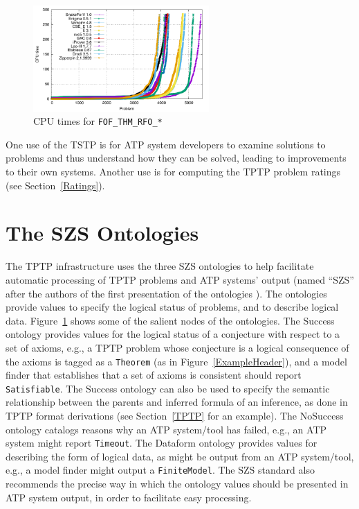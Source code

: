 \documentclass{easychair}
\begin{document}
\begin{figure}[t!]
\centering
\includegraphics[width=0.6\textwidth]{FOF_THM_RFO_PPP.pdf}
\vspace*{-1em}
\caption{CPU times for {\tt FOF\_THM\_RFO\_*}}
\label{PPPPlot}
\end{figure}

One use of the TSTP is for ATP system developers to examine solutions to problems and thus 
understand how they can be solved, leading to improvements to their own systems. 
Another use is for computing the TPTP problem ratings (see Section~\ref{Ratings}).

\section{The SZS Ontologies}
\label{SZS}

The TPTP infrastructure uses the three SZS ontologies to help facilitate 
automatic processing of TPTP problems and ATP systems' output 
\cite{Sut08-KEAPPA} (named ``SZS'' after the authors of the first 
presentation of the ontologies \cite{SZS03}).
The ontologies provide values to specify the logical status of problems, and 
to describe logical data.
Figure~\ref{SZS} shows some of the salient nodes of the ontologies.
The Success ontology provides values for the logical status of a conjecture 
with respect to a set of axioms, e.g., a TPTP problem whose conjecture is a
logical consequence of the axioms is tagged as a {\tt Theorem} (as in 
Figure~\ref{ExampleHeader}), and a model finder that establishes that a set 
of axioms is consistent should report {\tt Satisfiable}.
The Success ontology can also be used to specify the semantic relationship 
between the parents and inferred formula of an inference, as done in TPTP 
format derivations \cite{SS+06} (see Section~\ref{TPTP} for an example).
The NoSuccess ontology catalogs reasons why an ATP system/tool has failed,
e.g., an ATP system might report {\tt Timeout}.
The Dataform ontology provides values for describing the form of logical data,
as might be output from an ATP system/tool, e.g., a model finder might output 
a {\tt FiniteModel}.
The SZS standard also recommends the precise way in which the ontology values 
should be presented in ATP system output, in order to facilitate easy 
processing.
\end{document}
